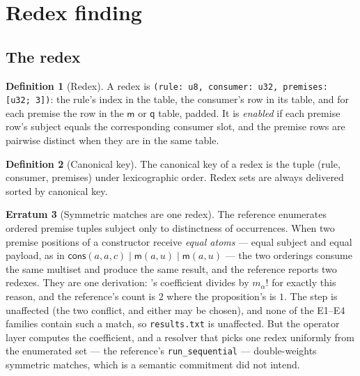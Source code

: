 \documentclass[11pt,a4paper]{article}
\newcommand{\code}[1]{\texttt{#1}}
\newcommand{\mm}{\mathsf{m}}
\newcommand{\qq}{\mathsf{q}}
\newcommand{\cons}{\mathsf{cons}}
\theoremstyle{definition}
\newtheorem{definition}{Definition}[section]
\newtheorem{erratum}[definition]{Erratum}
\theoremstyle{plain}
\begin{document}
\section{Redex finding}\label{sec:finders}

\subsection{The redex}

\begin{definition}[Redex]\label{def:redex}
A redex is \code{(rule: u8, consumer: u32, premises: [u32; 3])}: the rule's
index in the table, the consumer's row in its table, and for each premise the
row in the $\mm$ or $\qq$ table, padded. It is \emph{enabled} if each premise
row's subject equals the corresponding consumer slot, and the premise rows
are pairwise distinct when they are in the same table.
\end{definition}

\begin{definition}[Canonical key]\label{def:key}
The canonical key of a redex is the tuple (rule, consumer, premises) under
lexicographic order. Redex sets are always delivered sorted by canonical key.
\end{definition}

\begin{erratum}[Symmetric matches are one redex]\label{err:symmetric}
The reference enumerates ordered premise tuples subject only to distinctness
of occurrences. When two premise positions of a constructor receive
\emph{equal atoms} --- equal subject and equal payload, as in
$\cons(a,a,c) \mid \mm(a,u) \mid \mm(a,u)$ --- the two orderings consume the
same multiset and produce the same result, and the reference reports two
redexes. They are one derivation: \cite[Prop.~5.3]{matnote}'s coefficient
divides by $m_{\alpha}!$ for exactly this reason, and the reference's count is
$2$ where the proposition's is $1$. The step is unaffected (the two conflict,
and either may be chosen), and none of the E1--E4 families contain such a
match, so \code{results.txt} is unaffected. But the operator layer computes
the coefficient, and a resolver that picks one redex uniformly from the
enumerated set --- the reference's \code{run\_sequential} --- double-weights
symmetric matches, which is a semantic commitment
\cite[Obl.~13.1]{matnote} did not intend.
\end{erratum}
\end{document}
